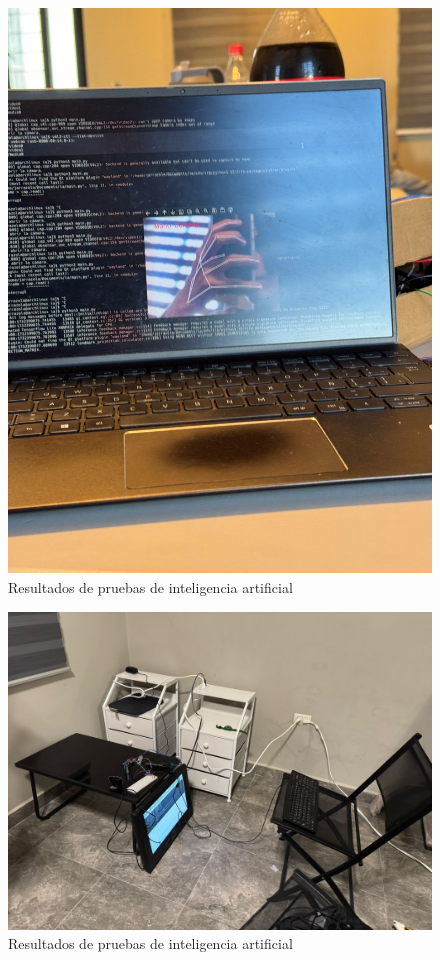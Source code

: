 \begin{figure}[H]
    \centering
    \includegraphics[width=1\textwidth]{img/PruebaIA8.png}
    \caption{Resultados de pruebas de inteligencia artificial}
    \label{fig:ai-test8}
\end{figure}

\begin{figure}[H]
    \centering
    \includegraphics[width=1\textwidth]{img/PruebaIA9.png}
    \caption{Resultados de pruebas de inteligencia artificial}
    \label{fig:ai-test9}
\end{figure}


